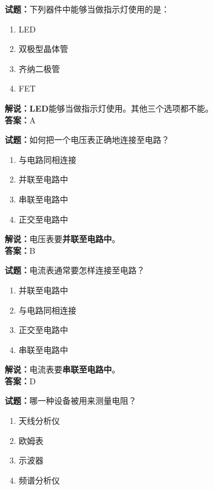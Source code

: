 \documentclass{ctexbook}
\begin{document}
\vspace{\baselineskip}

\noindent\textbf{试题：}下列器件中能够当做指示灯使用的是：

\begin{enumerate}[leftmargin=3em]
  \item LED
  \item 双极型晶体管
  \item 齐纳二极管
  \item FET
\end{enumerate}

\noindent\textbf{解说：LED}能够当做指示灯使用。其他三个选项都不能。\\\noindent\textbf{答案：}A

\vspace{\baselineskip}

\noindent\textbf{试题：}如何把一个电压表正确地连接至电路？

\begin{enumerate}[leftmargin=3em]
  \item 与电路同相连接
  \item 并联至电路中
  \item 串联至电路中
  \item 正交至电路中
\end{enumerate}

\noindent\textbf{解说：}电压表要\textbf{并联至电路中}。\\\noindent\textbf{答案：}B

\vspace{\baselineskip}

\noindent\textbf{试题：}电流表通常要怎样连接至电路？

\begin{enumerate}[leftmargin=3em]
  \item 并联至电路中
  \item 与电路同相连接
  \item 正交至电路中
  \item 串联至电路中
\end{enumerate}

\noindent\textbf{解说：}电流表要\textbf{串联至电路中}。\\\noindent\textbf{答案：}D

\vspace{\baselineskip}

\noindent\textbf{试题：}哪一种设备被用来测量电阻？

\begin{enumerate}[leftmargin=3em]
  \item 天线分析仪
  \item 欧姆表
  \item 示波器
  \item 频谱分析仪
\end{enumerate}
\end{document}

